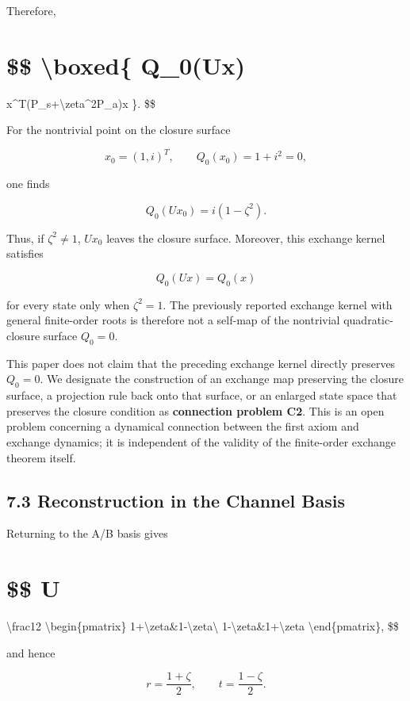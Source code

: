 \documentclass[
  a4paper,
  10pt]{article}
\begin{document}
Therefore,

\section{\$\$ \textbackslash boxed\{ Q\_0(Ux)}\label{-boxed-q_0ux}

x\^{}T(P\_s+\textbackslash zeta\^{}2P\_a)x \}. \$\$

For the nontrivial point on the closure surface

\[
x_0=(1,i)^T,
\qquad
Q_0(x_0)=1+i^2=0,
\]

one finds

\[
\boxed{
Q_0(Ux_0)=i(1-\zeta^2)
}.
\]

Thus, if \(\zeta^2\neq1\), \(Ux_0\) leaves the closure surface.
Moreover, this exchange kernel satisfies

\[
Q_0(Ux)=Q_0(x)
\]

for every state only when \(\zeta^2=1\). The previously reported
exchange kernel with general finite-order roots is therefore not a
self-map of the nontrivial quadratic-closure surface \(Q_0=0\).

This paper does not claim that the preceding exchange kernel directly
preserves \(Q_0=0\). We designate the construction of an exchange map
preserving the closure surface, a projection rule back onto that
surface, or an enlarged state space that preserves the closure condition
as \textbf{connection problem C2}. This is an open problem concerning a
dynamical connection between the first axiom and exchange dynamics; it
is independent of the validity of the finite-order exchange theorem
itself.

\subsection{7.3 Reconstruction in the Channel
Basis}\label{73-reconstruction-in-the-channel-basis}

Returning to the A/B basis gives

\section{\$\$ U}\label{-u}

\textbackslash frac12 \textbackslash begin\{pmatrix\}
1+\textbackslash zeta\&1-\textbackslash zeta\textbackslash{}
1-\textbackslash zeta\&1+\textbackslash zeta
\textbackslash end\{pmatrix\}, \$\$

and hence

\[
\boxed{
r=\frac{1+\zeta}{2},
\qquad
t=\frac{1-\zeta}{2}
}.
\]
\end{document}
